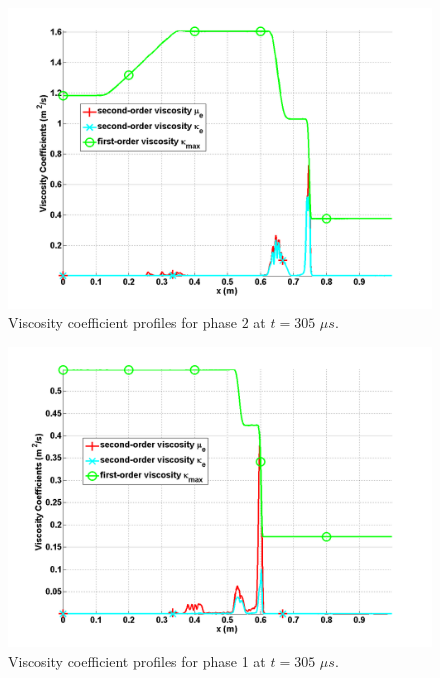 \begin{figure}[H]
\centering
\includegraphics[width=\textwidth]{figures/SEM/two_phases_liquid_viscosity_kappa_mu.png}
\caption{Viscosity coefficient profiles for phase $2$ at $t=305$ $\mu s$.}
\label{fig:two-indep-fluids-visc-2-7-eqn-sect4}
\end{figure}
%
\begin{figure}[H]
\centering
\includegraphics[width=\textwidth]{figures/SEM/two_phases_vapor_viscosity_kappa_mu.png}
\caption{Viscosity coefficient profiles for phase 1 at $t=305$ $\mu s$.}
\label{fig:two-indep-fluids-visc-1-7-eqn-sect4}
\end{figure}
%
